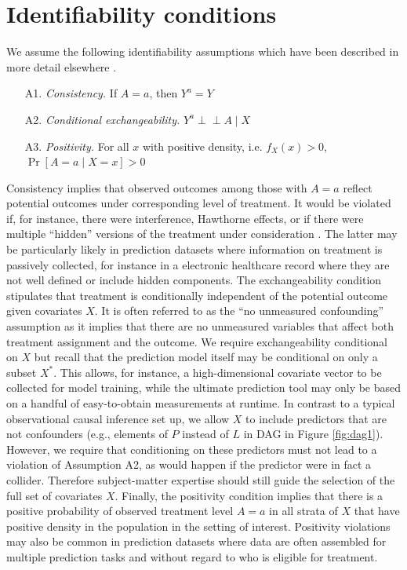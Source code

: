 \section{Identifiability conditions} \label{sec:identifiability}
We assume the following identifiability assumptions which have been described in more detail elsewhere \cite{hernan_causal_2020, robins_new_1986, robins_graphical_1987}.

\begin{enumerate}
    \item[A1.] \textit{Consistency.} If $A = a$, then $Y^a = Y$ 
    \item[A2.] \textit{Conditional exchangeability.} $Y^a \perp\!\!\!\perp A \mid X$ 
    \item[A3.] \textit{Positivity.} For all $x$ with positive density, i.e. $f_X(x) > 0$, $\Pr[A = a \mid X = x] > 0$ 
\end{enumerate}

Consistency implies that observed outcomes among those with $A = a$ reflect potential outcomes under corresponding level of treatment. It would be violated if, for instance, there were interference, Hawthorne effects, or if there were multiple ``hidden'' versions of the treatment under consideration \cite{rubin_randomization_1980,dahabreh2019generalizing}. The latter may be particularly likely in prediction datasets where information on treatment is passively collected, for instance in a electronic healthcare record where they are not well defined or include hidden components. The exchangeability condition stipulates that treatment is conditionally independent of the potential outcome given covariates $X$. It is often referred to as the ``no unmeasured confounding'' assumption as it implies that there are no unmeasured variables that affect both treatment assignment and the outcome.  We require exchangeability conditional on $X$ but recall that the prediction model itself may be conditional on only a subset $X^*$. This allows, for instance, a high-dimensional covariate vector to be collected for model training, while the ultimate prediction tool may only be based on a handful of easy-to-obtain measurements at runtime. In contrast to a typical observational causal inference set up, we allow $X$ to include predictors that are not confounders (e.g., elements of $P$ instead of $L$ in DAG in Figure \ref{fig:dag1}). However, we require that conditioning on these predictors must not lead to a violation of Assumption A2, as would happen if the predictor were in fact a collider. Therefore subject-matter expertise should still guide the selection of the full set of covariates $X$. Finally, the positivity condition implies that there is a positive probability of observed treatment level $A = a$ in all strata of $X$ that have positive density in the population in the setting of interest. Positivity violations may also be common in prediction datasets where data are often assembled for multiple prediction tasks and without regard to who is eligible for treatment.


